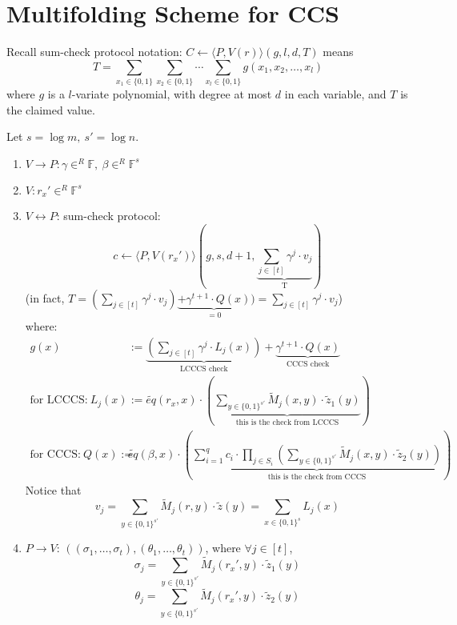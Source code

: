 \documentclass{article}
\theoremstyle{definition}
\begin{document}
\section{Multifolding Scheme for CCS}
Recall sum-check protocol notation: \underline{$C \leftarrow \langle P, V(r) \rangle (g, l, d, T)$} means
$$T=\sum_{x_1 \in \{0,1\}} \sum_{x_2 \in \{0,1\}} \cdots \sum_{x_l \in \{0,1\}} g(x_1, x_2, \ldots, x_l)$$
where $g$ is a $l$-variate polynomial, with degree at most $d$ in each variable, and $T$ is the claimed value.

\vspace{1cm}

Let $s= \log m,~ s'= \log n$.

\begin{enumerate}
	\item $V \rightarrow P: \gamma \in^R \mathbb{F},~ \beta \in^R \mathbb{F}^s$
	\item $V: r_x' \in^R \mathbb{F}^s$
	\item $V \leftrightarrow P$: sum-check protocol:
		$$c \leftarrow \langle P, V(r_x') \rangle (g, s, d+1, \underbrace{\sum_{j \in [t]} \gamma^j \cdot v_j}_\text{T})$$
		(in fact, $T=(\sum_{j \in [t]} \gamma^j \cdot v_j) \underbrace{+ \gamma^{t+1} \cdot Q(x)}_{=0}) = \sum_{j \in [t]} \gamma^j \cdot v_j$)\\
		where:
		\begin{align*}
			g(x) &:= \underbrace{\left( \sum_{j \in [t]} \gamma^j \cdot L_j(x) \right)}_\text{LCCCS check} + \underbrace{\gamma^{t+1} \cdot Q(x)}_\text{CCCS check}\\
			\text{for LCCCS:}~ L_j(x) &:= \widetilde{eq}(r_x, x) \cdot \left(
				\underbrace{\sum_{y \in \{0,1\}^{s'}} \widetilde{M}_j(x, y) \cdot \widetilde{z}_1(y)}_\text{this is the check from LCCCS}
			\right)\\
				\text{for CCCS:}~ Q(x) := &\widetilde{eq}(\beta, x) \cdot \left(
				\underbrace{ \sum_{i=1}^q c_i \cdot \prod_{j \in S_i} \left( \sum_{y \in \{0, 1\}^{s'}} \widetilde{M}_j(x, y) \cdot \widetilde{z}_2(y) \right) }_\text{this is the check from CCCS}
			\right)
		\end{align*}
		Notice that
		$$v_j= \sum_{y\in \{0,1\}^{s'}} \widetilde{M}_j(r, y) \cdot \widetilde{z}(y) = \sum_{x\in \{0,1\}^s} L_j(x)$$
	\item $P \rightarrow V$: $\left( (\sigma_1, \ldots, \sigma_t), (\theta_1, \ldots, \theta_t) \right)$, where $\forall j \in [t]$,
		$$\sigma_j = \sum_{y \in \{0,1\}^{s'}} \widetilde{M}_j(r_x', y) \cdot \widetilde{z}_1(y)$$
		$$\theta_j = \sum_{y \in \{0, 1\}^{s'}} \widetilde{M}_j(r_x', y) \cdot \widetilde{z}_2(y)$$

\end{enumerate}
\end{document}

